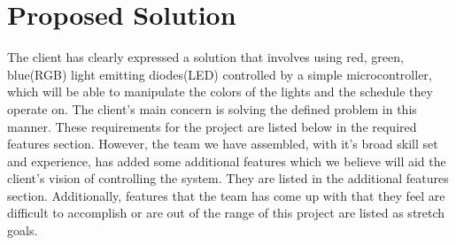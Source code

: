 \documentclass[letterpaper,10pt,draftclsnofoot,onecolumn]{article}
\begin{document}
	\section*{Proposed Solution}
	The client has clearly expressed a solution that involves using red, green, blue(RGB) light emitting diodes(LED) controlled by a simple microcontroller, which will be able to manipulate the colors of the lights and the schedule they operate on.  The client's main concern is solving the defined problem in this manner.  These requirements for the project are listed below in the required features section.  However, the team we have assembled, with it's broad skill set and experience, has added some additional features which we believe will aid the client's vision of controlling the system.  They are listed in the additional features section.  Additionally, features that the team has come up with that they feel are difficult to accomplish or are out of the range of this project are listed as stretch goals.
\end{document}

